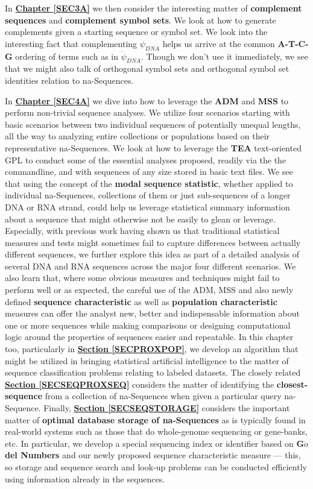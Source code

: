 \documentclass[a4paper, 18pt]{book} %
\begin{document}
In \textbf{\hyperref[SEC3A]{Chapter \ref{SEC3A}}} we then consider the interesting matter of \textbf{complement sequences} and \textbf{complement symbol sets}. We look at how to generate complements given a starting sequence or symbol set. We look into the interesting fact that complementing $\psi_{DNA}$ helps us arrive at the common \textbf{A-T-C-G} ordering of terms such as in $\dot{\psi}_{DNA}$. Though we don't use it immediately, we see that we might also talk of orthogonal symbol sets and orthogonal symbol set identities relation to na-Sequences.

In \textbf{\hyperref[SEC4A]{Chapter \ref{SEC4A}}} we dive into how to leverage the \textbf{ADM} and \textbf{MSS} to perform non-trivial sequence analyses. We utilize four scenarios starting with basic scenarios between two individual sequences of potentially unequal lengths, all the way to analyzing entire collections or populations based on their representative na-Sequences. We look at how to leverage the \textbf{TEA} text-oriented GPL to conduct some of the essential analyses proposed, readily via the the commandline, and with sequences of any size stored in basic text files. We see that using the concept of the \textbf{modal sequence statistic}, whether applied to individual na-Sequences, collections of them or just sub-sequences of a longer DNA or RNA strand, could help us leverage statistical summary information about a sequence that might otherwise not be easily to glean or leverage. Especially, with previous work having shown us that traditional statistical measures and tests might sometimes fail to capture differences between actually different sequences, we further explore this idea as part of a detailed analysis of several DNA and RNA sequences across the major four different scenarios. We also learn that, where some obvious measures and techniques might fail to perform well or as expected, the careful use of the ADM, MSS and also newly defined \textbf{sequence characteristic} as well as \textbf{population characteristic} measures can offer the analyst new, better and indispensable information about one or more sequences while making comparisons or designing computational logic around the properties of sequences easier and repeatable. In this chapter too, particularly in \textbf{\hyperref[SECPROXPOP]{Section \ref{SECPROXPOP}}}, we develop an algorithm that might be utilized in bringing statistical artificial intelligence to the matter of sequence classification problems relating to labeled datasets. The closely related \textbf{\hyperref[SECSEQPROXSEQ]{Section \ref{SECSEQPROXSEQ}}} considers the matter of identifying the \textbf{closest-sequence} from a collection of na-Sequences when given a particular query na-Sequence. Finally, \textbf{\hyperref[SECSEQSTORAGE]{Section \ref{SECSEQSTORAGE}}} considers the important matter of \textbf{optimal database storage of na-Sequences} as is typically found in real-world systems such as those that do whole-genome sequencing or gene-banks, etc. In particular, we develop a special sequencing index or identifier based on \textbf{G$\ddot{o}$del Numbers} and our newly proposed sequence characteristic measure --- this, so storage and sequence search and look-up problems can be conducted efficiently using information already in the sequences.
\end{document}
